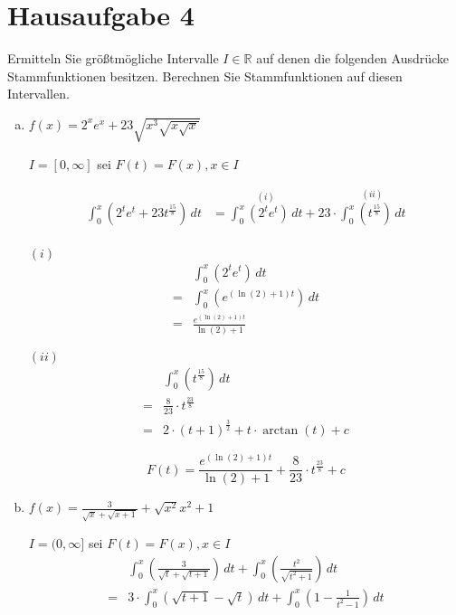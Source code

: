 \documentclass{article}
\begin{document}
\section*{Hausaufgabe 4}

Ermitteln Sie größtmögliche Intervalle $I \in \mathbb{R}$ auf denen
die folgenden Ausdrücke Stammfunktionen besitzen.
Berechnen Sie Stammfunktionen auf diesen Intervallen.

\begin{enumerate}[a)]
\item $f(x) = 2^xe^x + 23 \sqrt{x^3\sqrt{x\sqrt{x}}}$

  $I = [0, \infty]$ sei $F(t) = F(x), x \in I$

  \begin{align*}
    \int_0^x \left( 2^te^t + 23 t^{\frac{15}{8}} \right)\,dt &=
    \overset{(i)}{\int_0^x \left( 2^te^t \right) \,dt} + 23 \cdot \overset{(ii)}{\int_0^x \left(t^{\frac{15}{8}} \right) \,dt} \\
  \end{align*}
  \begin{minipage}[t]{.45\textwidth}
    \textbf{$(i)$}
    \begin{align*}
      &\int_0^x \left( 2^te^t \right) \,dt \\
      = & \int_0^x \left( e^{(\ln(2) + 1)t} \right) \,dt \\
      = & \frac{e^{(\ln(2) + 1)t}}{\ln(2) + 1}
    \end{align*}
  \end{minipage}
  \hfill
  \begin{minipage}[t]{.45\textwidth}
    \textbf{$(ii)$}
    \begin{align*}
      &\int_0^x \left( t^{\frac{15}{8}} \right) \,dt \\
      = & \frac{8}{23} \cdot t^{\frac{23}{8}} \\
      = & 2 \cdot (t + 1)^{\frac{3}{2}} + t \cdot \arctan (t) + c
    \end{align*}
  \end{minipage}
  \[
    F(t) = \frac{e^{(\ln(2) + 1)t}}{\ln(2) + 1} + \frac{8}{23} \cdot t^{\frac{23}{8}} + c
  \]

\item $f(x) = \frac{3}{\sqrt{x} + \sqrt{x + 1}} + \sqrt{x^2}{x^2 + 1}$

  $I = (0, \infty]$ sei $F(t) = F(x), x \in I$
  \begin{align*}
    &\int_0^x \left( \frac{3}{\sqrt{t} + \sqrt{t + 1}} \right)\,dt + \int_0^x \left( \frac{t^2}{\sqrt{t^2 + 1}} \right)\,dt \\
    = &3 \cdot \int_0^x \left( \sqrt{t + 1} - \sqrt{t} \right)\,dt + \int_0^x \left( 1 - \frac{1}{t^2 - 1} \right)\,dt
  \end{align*}


\end{enumerate}
\end{document}
